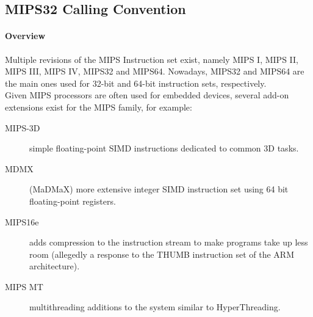 %
%
%
%

\subsection{MIPS32 Calling Convention}

\paragraph{Overview}

Multiple revisions of the MIPS Instruction set exist, namely MIPS I, MIPS II, MIPS III, MIPS IV, MIPS32 and MIPS64.
Nowadays, MIPS32 and MIPS64 are the main ones used for 32-bit and 64-bit instruction sets, respectively.\\
Given MIPS processors are often used for embedded devices, several add-on extensions exist for the MIPS family, for example: 

\begin{description}
\item [MIPS-3D] simple floating-point SIMD instructions dedicated to common 3D tasks.
\item [MDMX] (MaDMaX) more extensive integer SIMD instruction set using 64 bit floating-point registers.
\item [MIPS16e] adds compression to the instruction stream to make programs take up less room (allegedly a response to the THUMB instruction set of the ARM architecture).
\item [MIPS MT] multithreading additions to the system similar to HyperThreading.
\end{description}

